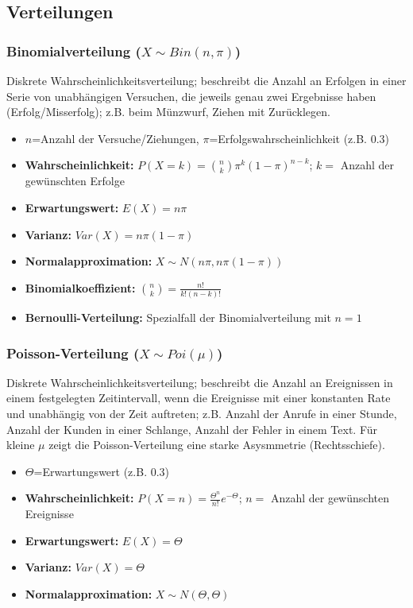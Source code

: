 \subsection{Verteilungen}
\label{verteilungen}

\subsubsection{Binomialverteilung (\(X\sim Bin(n,\pi)\))}
Diskrete Wahrscheinlichkeitsverteilung; beschreibt die Anzahl an Erfolgen in einer Serie von unabhängigen Versuchen, die jeweils genau zwei Ergebnisse haben (Erfolg/Misserfolg); z.B. beim Münzwurf, Ziehen mit Zurücklegen.

\begin{itemize}
    \item \(n\)=Anzahl der Versuche/Ziehungen, \(\pi\)=Erfolgswahrscheinlichkeit (z.B. \(0.3\))
    \item \textbf{Wahrscheinlichkeit:} \(P(X=k)=\binom{n}{k}\pi^k(1-\pi)^{n-k}\); \(k=\) Anzahl der gewünschten Erfolge
    \item \textbf{Erwartungswert:} \(E(X)=n\pi\)
    \item \textbf{Varianz:} \(Var(X)=n\pi(1-\pi)\)
    \item \textbf{Normalapproximation:} \(X\sim N(n\pi, n\pi(1-\pi))\)
    \item \textbf{Binomialkoeffizient:} \(\binom{n}{k}=\frac{n!}{k!(n-k)!}\)
    \item \textbf{Bernoulli-Verteilung:} Spezialfall der Binomialverteilung mit \(n=1\)
\end{itemize}


\subsubsection{Poisson-Verteilung (\(X\sim Poi(\mu)\))}
Diskrete Wahrscheinlichkeitsverteilung; beschreibt die Anzahl an Ereignissen in einem festgelegten Zeitintervall, wenn die Ereignisse mit einer konstanten Rate und unabhängig von der Zeit auftreten; z.B. Anzahl der Anrufe in einer Stunde, Anzahl der Kunden in einer Schlange, Anzahl der Fehler in einem Text. Für kleine \(\mu\) zeigt die Poisson-Verteilung eine starke Asysmmetrie (Rechtsschiefe).

\begin{itemize}
    \item \(\varTheta \)=Erwartungswert (z.B. \(0.3\))
    \item \textbf{Wahrscheinlichkeit:} \(P(X=n)=\frac{\varTheta^n}{n!}e^{-\varTheta}\); \(n=\) Anzahl der gewünschten Ereignisse
    \item \textbf{Erwartungswert:} \(E(X)=\varTheta\)
    \item \textbf{Varianz:} \(Var(X)=\varTheta\)
    \item \textbf{Normalapproximation:} \(X\sim N(\varTheta, \varTheta)\)
\end{itemize}


